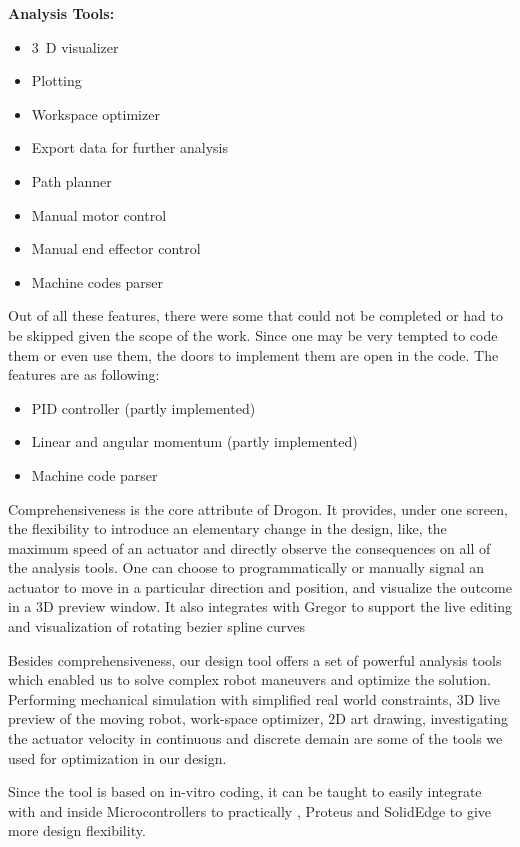 {    \textbf{Analysis Tools:}
    \begin{itemize}
      \item $3$~D visualizer
      \item Plotting
      \item Workspace optimizer
      \item Export data for further analysis
      \item Path planner
      \item Manual motor control
      \item Manual end effector control
      \item Machine codes parser
    \end{itemize}

    Out of all these features, there were some that could not be completed or had to be skipped given the scope of the work. Since one may be very tempted to code them or even use them, the doors to implement them are open in the code. The features are as following:
    \begin{itemize}
      \item PID controller (partly implemented)
      \item Linear and angular momentum (partly implemented)
      \item Machine code parser
    \end{itemize}

    Comprehensiveness is the core attribute of Drogon. It provides, under one screen, the flexibility to introduce an elementary change in the design, like, the maximum speed of an actuator and directly observe the consequences on all of the analysis tools. One can choose to programmatically or manually signal an actuator to move in a particular direction and position, and visualize the outcome in a $3$D preview window. It also integrates with Gregor to support the live editing and visualization of rotating bezier spline curves

    Besides comprehensiveness, our design tool offers a set of powerful analysis tools which enabled us to solve complex robot maneuvers and optimize the solution. Performing mechanical simulation with simplified real world constraints, $3$D live preview of the moving robot, work-space optimizer, $2$D art drawing, investigating the actuator velocity in continuous and discrete demain are some of the tools we used for optimization in our design.

    Since the tool is based on in-vitro coding, it can be taught to easily integrate with and inside Microcontrollers to practically , Proteus and SolidEdge to give more design flexibility.

}
